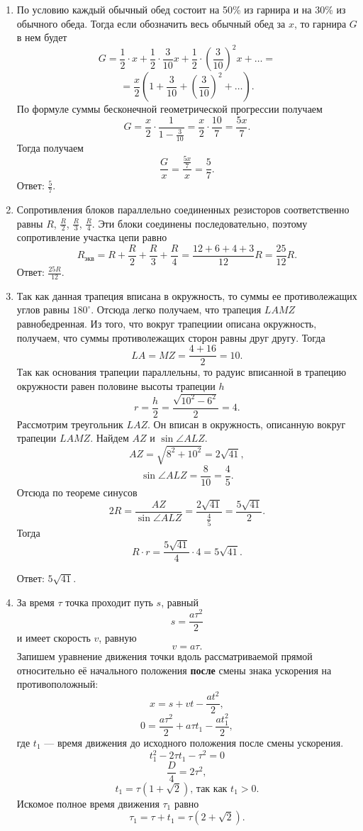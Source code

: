 \documentclass[12pt]{article} %
\begin{document}
\begin{enumerate}
\item По условию каждый обычный обед состоит на 50\% из гарнира и на 30\% из обычного обеда. Тогда если обозначить весь обычный обед за $x$, то гарнира $G$ в нем будет
\[
G =\frac{1}{2}\cdot x + \frac{1}{2} \cdot \frac{3}{10}x + \frac{1}{2} \cdot \left( \frac{3}{10}\right )^{2} x + \ldots = 
\]
\[
    = \frac{x}{2}  \left( 1 + \frac{3}{10} + \left( \frac{3}{10}\right) ^{2} + \ldots \right).
\]
По формуле суммы бесконечной геометрической прогрессии получаем
\[
    G =\frac{x}{2} \cdot \frac{1}{1-\frac{3}{10}} = \frac{x}{2} \cdot \frac{10}{7} = \frac{5x}{7}.
\]
Тогда получаем
\[
\frac{G}{x} = \frac{\frac{5x}{7}}{x} = \frac{5}{7}.
\]
Ответ: $\frac{5}{7}$.
\item Сопротивления блоков параллельно соединенных резисторов соответственно равны $R$, $\frac{R}{2}$, $\frac{R}{3}$, $\frac{R}{4}$. Эти блоки соединены последовательно, поэтому сопротивление участка цепи равно
\[
    R_{\text{экв}} = R + \frac{R}{2} + \frac{R}{3} + \frac{R}{4} = \frac{12+6+4+3}{12}R = \frac{25}{12}R.
\]
Ответ: $\frac{25R}{12}$.

\item Так как  данная трапеция вписана в окружность, то суммы ее противолежащих углов равны $180^{\circ}$. Отсюда легко получаем, что трапеция $LAMZ$ равнобедренная. Из того, что вокруг трапециии описана окружность, получаем, что суммы противолежащих сторон равны друг другу. Тогда
\[
LA = MZ = \frac{4+16}{2} = 10.
\]
Так как основания трапеции параллельны, то радуис вписанной в трапецию окружности равен половине высоты трапеции $h$
\[
r = \frac{h}{2} = \frac{\sqrt{10^2 - 6^2}}{2} = 4.
\]
Рассмотрим треугольник $LAZ$. Он вписан в окружность, описанную вокруг трапеции $LAMZ$. Найдем $AZ$ и $\sin \angle ALZ$.
\[
AZ = \sqrt{8^2 + 10^2} = 2\sqrt{41},
\]
\[
\sin \angle ALZ = \frac{8}{10} = \frac{4}{5}.
\]
Отсюда по теореме синусов
\[
2R=\frac{AZ}{\sin \angle ALZ} = \frac{2\sqrt{41}}{\frac{4}{5}} = \frac{5\sqrt{41}}{2}.
\]
Тогда 
\[
R \cdot r = \frac{5\sqrt{41}}{4} \cdot 4 =  5\sqrt{41}.
\]

Ответ: $5\sqrt{41}$.  


\item         За время $\tau$ точка проходит путь $s$, равный
\[
    s = \frac{a\tau ^2}{2}
\]
и имеет скорость $v$, равную
\[
    v = a \tau.
\]
Запишем уравнение движения точки вдоль рассматриваемой прямой относительно её начального положения \textbf{после} смены знака ускорения на противоположный:
\[
    x = s + vt - \frac{at^2}{2},
\]
\[
    0 = \frac{a\tau ^2}{2} + a \tau t_1 - \frac{at_1^2}{2},
\]
где $t_1$ — время движения до исходного положения после смены ускорения.
\[
    t_1^2 - 2\tau t_1 - \tau ^2 = 0
\]
\[
    \frac{D}{4} =2 \tau ^2,
\]
\[
    t_1 = \tau (1 + \sqrt{2})\text{, так как $t_1 > 0$}.
\]
Искомое полное время движения $\tau _1$ равно 
\[
    \tau _1 = \tau + t_1 = \tau (2 + \sqrt{2}).
\]
\end{enumerate}
    
\end{document}
